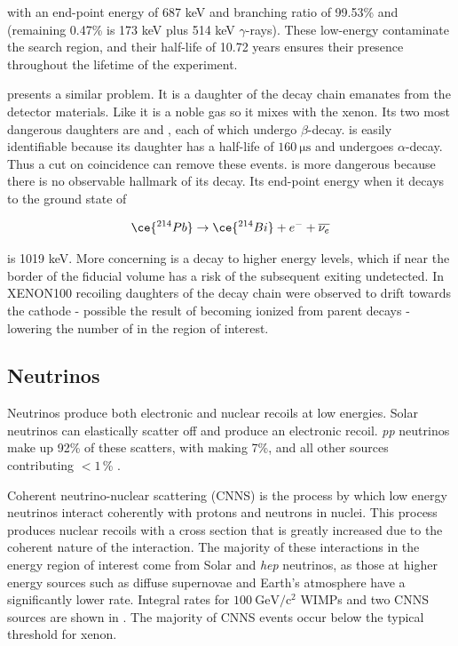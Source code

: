 \noindent with an end-point energy of 687 keV and branching ratio of 99.53\% and (remaining 0.47\% is 173 keV plus 514 keV
$\gamma$-rays).  These low-energy \betadecays
contaminate the search region, and their half-life of 10.72 years ensures their presence throughout the lifetime of the experiment.

 presents a similar problem.  It is a daughter of the  decay chain emanates from the detector materials.  Like
 it is a noble gas so it mixes with the xenon.  Its two most dangerous daughters are \leadtwofourteen and , each
of which
undergo $\beta$-decay.   is easily identifiable because its daughter \poloniumtwofourteen has a half-life of
$160\ \mathrm{\mu s}$ and undergoes $\alpha$-decay.  Thus a cut on coincidence can remove these events.  \leadtwofourteen is more
dangerous because there is no observable hallmark of its decay.  Its end-point energy when it decays to the ground state of
\bismuthtwofourteen

\begin{equation}
\ce{^{214}Pb} \rightarrow \ce{^{214}Bi} + e^{-} + \overline{\nu_{e}}
\end{equation}

\noindent is 1019 keV.  More concerning is a decay to higher energy levels, which
if near the border of the fiducial volume has a risk of the subsequent \gammaray exiting undetected.  In XENON100 recoiling daughters of
the  decay chain were observed to drift towards the cathode - possible the result of becoming ionized from parent decays
 - lowering the number of \betadecays in the region of interest.


\subsection{Neutrinos}
\label{subsec:neutrinos}
Neutrinos produce both electronic and nuclear recoils at low energies.  Solar neutrinos can elastically scatter off \electron
and produce an electronic recoil.  \textit{pp} neutrinos make up 92\% of these scatters, with  making 7\%, and all other
sources contributing ${<1}\, $\% .

Coherent neutrino-nuclear scattering (CNNS) is the process by which low energy neutrinos interact coherently with protons and neutrons in
nuclei.  This process produces nuclear recoils with a cross section that is greatly increased due to the coherent nature of the
interaction.  The majority of these interactions in the energy region of interest come from Solar 
and \textit{hep} neutrinos, as those at higher energy sources such as diffuse supernovae and Earth's atmosphere have a significantly
lower rate.  Integral rates for $100\ \mathrm{GeV/c^2}$ WIMPs and two CNNS sources are shown in
.  The majority of CNNS events occur below the typical threshold for xenon.


